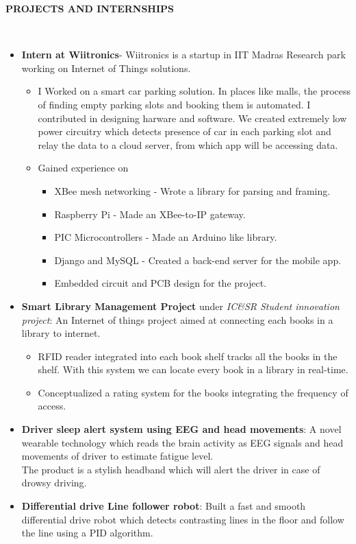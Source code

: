 \documentclass[a4paper,10pt]{article}
\newcommand{\lsep}{-0.5cm}
\newcommand{\resheading}[1]{{\small \colorbox{mygrey}{\begin{minipage}{0.975\textwidth}{\textbf{#1 \vphantom{p\^{E}}}}\end{minipage}}}}
\begin{document}
\resheading{\textbf{PROJECTS AND INTERNSHIPS} }\\[\lsep]
    \begin{itemize}
        \item \textbf{Intern at Wiitronics}- Wiitronics is a startup in IIT Madras Research park working on Internet of Things solutions.
        \begin{itemize}
            \item I Worked on a smart car parking solution. In places like malls, the process of finding empty parking slots and booking them is automated. I contributed in designing harware and software. We created extremely low power circuitry which detects presence of car in each parking slot and relay the data to a cloud server, from which app will be accessing data.
            \item Gained experience on 
            \begin{itemize}
                \item XBee mesh networking - Wrote a library for parsing and framing.
                \item Raspberry Pi - Made an XBee-to-IP gateway.
                \item PIC Microcontrollers - Made an Arduino like library.
                \item Django and MySQL - Created a back-end server for the mobile app.
                \item Embedded circuit and PCB design for the project.
            \end{itemize}
        \end{itemize}        

        \item \textbf{Smart Library Management Project} under \textit{IC\&SR Student innovation project}: An Internet of things project aimed at connecting each books in a library to internet. 
        \begin{itemize}
            \item RFID reader integrated into each book shelf tracks all the books in the shelf. With this system we can locate every book in a library in real-time.
            \item Conceptualized a rating system for the books integrating the frequency of access.
        \end{itemize}        

        \item \textbf{Driver sleep alert system using EEG and head movements}: A novel wearable technology which reads the brain activity as EEG signals and head movements of driver to estimate fatigue level.\\
        The product is a stylish headband which will alert the driver in case of drowsy driving.
        \item \textbf{Differential drive Line follower robot}: Built a fast and smooth differential drive robot which detects contrasting lines in the floor and follow the line using a PID algorithm.


\end{itemize}
\end{document}
